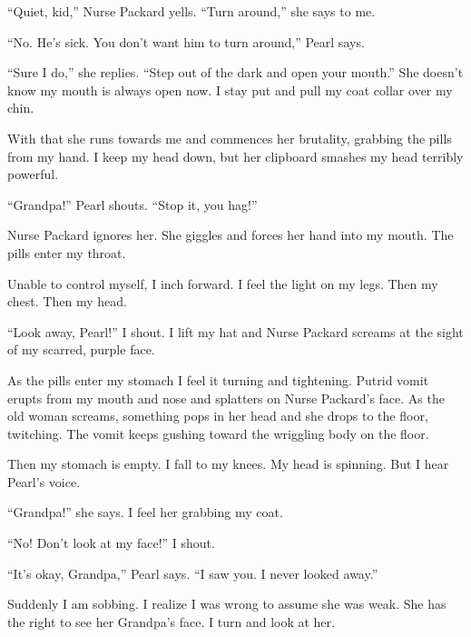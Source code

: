 ``Quiet, kid,'' Nurse Packard yells. ``Turn
around,'' she says to me.



``No. He's sick. You don't want him to turn
around,'' Pearl says.



``Sure I do,'' she replies. ``Step out of the dark
and open your mouth.'' She doesn't know my mouth is
always open now. I stay put and pull my coat collar over my
chin.



With that she runs towards me and commences her brutality, grabbing
the pills from my hand. I keep my head down, but her clipboard
smashes my head terribly powerful.



``Grandpa!'' Pearl shouts. ``Stop it, you
hag!''



Nurse Packard ignores her. She giggles and forces her hand into my
mouth. The pills enter my throat.



Unable to control myself, I inch forward. I feel the light on my
legs. Then my chest. Then my head.



``Look away, Pearl!'' I shout. I lift my hat and Nurse
Packard screams at the sight of my scarred, purple face.



As the pills enter my stomach I feel it turning and tightening.
Putrid vomit erupts from my mouth and nose and splatters on Nurse
Packard's face. As the old woman screams, something pops in
her head and she drops to the floor, twitching. The vomit keeps
gushing toward the wriggling body on the floor.



Then my stomach is empty. I fall to my knees. My head is spinning.
But I hear Pearl's voice.



``Grandpa!'' she says. I feel her grabbing my coat.



``No! Don't look at my face!'' I shout.



``It's okay, Grandpa,'' Pearl says. ``I saw
you. I never looked away.''



Suddenly I am sobbing. I realize I was wrong to assume she was
weak. She has the right to see her Grandpa's face. I turn and
look at her.



